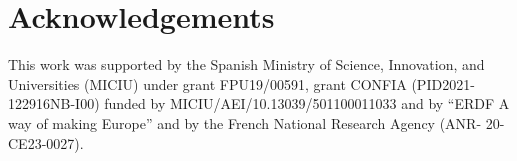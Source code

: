 \section*{Acknowledgements}
\label{sec:acknowledgements}

This work was supported by the Spanish Ministry of Science, Innovation, and Universities (MICIU) under grant FPU19/00591, grant CONFIA (PID2021-122916NB-I00) funded by MICIU/AEI/10.13039/501100011033 and by “ERDF A way of making Europe” and by the French National Research Agency (ANR- 20-CE23-0027).
